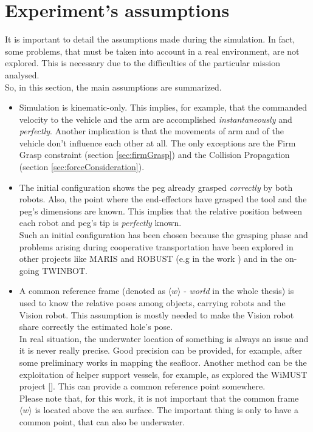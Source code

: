 \section{Experiment's assumptions}
\label{sec:expAssumption}
It is important to detail the assumptions made during the simulation. In fact, some problems, that must be taken into account in a real environment, are not explored. This is necessary due to the difficulties of the particular mission analysed. \\
So, in this section, the main assumptions are summarized.

\begin{itemize}
	\item Simulation is kinematic-only. This implies, for example, that the commanded velocity to the vehicle and the arm are accomplished \textit{instantaneously} and \textit{perfectly}. Another implication is that the movements of arm and of the vehicle don't influence each other at all. The only exceptions are the Firm Grasp constraint (section \ref{sec:firmGrasp}) and the Collision Propagation (section \ref{sec:forceConsideration}).
	
	\item The initial configuration shows the peg already grasped \textit{correctly} by both robots. Also, the point where the end-effectors have grasped the tool and the peg's dimensions are known. This implies that the relative position between each robot and peg's tip is \textit{perfectly} known.\\
	Such an initial configuration has been chosen because the grasping phase and problems arising during cooperative transportation have been explored in other projects like MARIS and ROBUST (e.g in the work \cite{IntroMaris2}) and in the on-going TWINBOT.
	
	
	\item A common reference frame (denoted as $\langle w \rangle$ - \textit{world} in the whole thesis) is used to know the relative poses among objects, carrying robots and the Vision robot. This assumption is mostly needed to make the Vision robot share correctly the estimated hole's pose.\\
	In real situation, the underwater location of something is always an issue and it is never really precise. Good precision can be provided, for example, after some preliminary works in mapping the seafloor. Another method can be the exploitation of helper support vessels, for example, as explored the WiMUST project [\cite{wimust}]. This can provide a common reference point somewhere.\\
	Please note that, for this work, it is not important that the common frame $\langle w \rangle$ is located above the sea surface. The important thing is only to have a common point, that can also be underwater.\\


\end{itemize}
